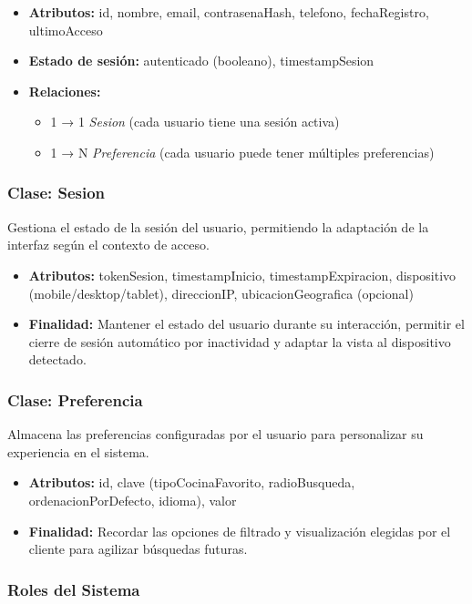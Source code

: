 \begin{itemize}
    \item \textbf{Atributos:} id, nombre, email, contrasenaHash, telefono, fechaRegistro, ultimoAcceso
    \item \textbf{Estado de sesión:} autenticado (booleano), timestampSesion
    \item \textbf{Relaciones:}
    \begin{itemize}
        \item 1 → 1 \textit{Sesion} (cada usuario tiene una sesión activa)
        \item 1 → N \textit{Preferencia} (cada usuario puede tener múltiples preferencias)
    \end{itemize}
\end{itemize}

\subsubsection{Clase: Sesion}
Gestiona el estado de la sesión del usuario, permitiendo la adaptación de la interfaz según el contexto de acceso.

\begin{itemize}
    \item \textbf{Atributos:} tokenSesion, timestampInicio, timestampExpiracion, dispositivo (mobile/desktop/tablet), direccionIP, ubicacionGeografica (opcional)
    \item \textbf{Finalidad:} Mantener el estado del usuario durante su interacción, permitir el cierre de sesión automático por inactividad y adaptar la vista al dispositivo detectado.
\end{itemize}

\subsubsection{Clase: Preferencia}
Almacena las preferencias configuradas por el usuario para personalizar su experiencia en el sistema.

\begin{itemize}
    \item \textbf{Atributos:} id, clave (tipoCocinaFavorito, radioBusqueda, ordenacionPorDefecto, idioma), valor
    \item \textbf{Finalidad:} Recordar las opciones de filtrado y visualización elegidas por el cliente para agilizar búsquedas futuras.
\end{itemize}

\subsubsection{Roles del Sistema}

